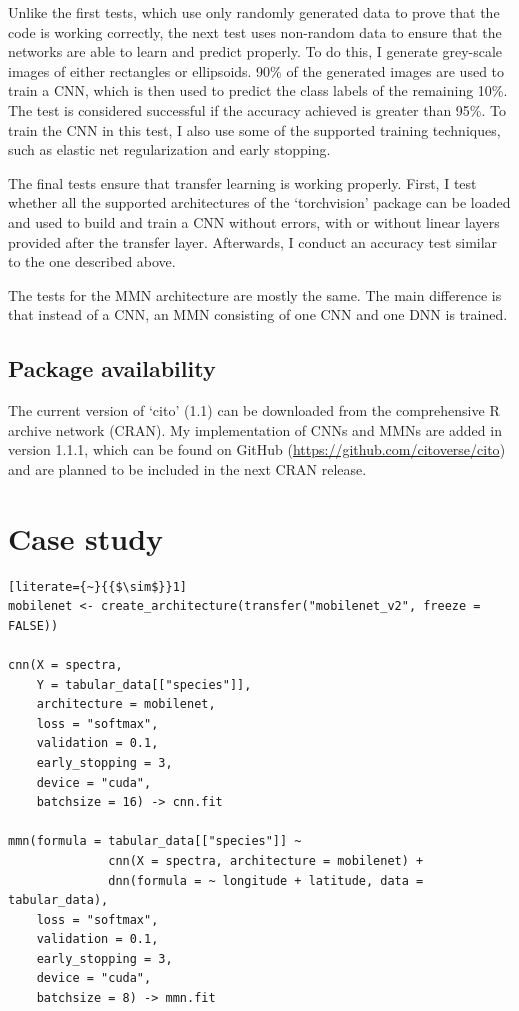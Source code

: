 \documentclass[12pt,twoside]{scrreport}
\newcommand{\pkg}[1]{`#1'}
\begin{document}
Unlike the first tests, which use only randomly generated data to prove that the code is working correctly, the next test uses non-random data to ensure that the networks are able to learn and predict properly. To do this, I generate grey-scale images of either rectangles or ellipsoids. 90\% of the generated images are used to train a CNN, which is then used to predict the class labels of the remaining 10\%. The test is considered successful if the accuracy achieved is greater than 95\%. To train the CNN in this test, I also use some of the supported training techniques, such as elastic net regularization and early stopping.

The final tests ensure that transfer learning is working properly. First, I test whether all the supported architectures of the \pkg{torchvision} package can be loaded and used to build and train a CNN without errors, with or without linear layers provided after the transfer layer. Afterwards, I conduct an accuracy test similar to the one described above.

The tests for the MMN architecture are mostly the same. The main difference is that instead of a CNN, an MMN consisting of one CNN and one DNN is trained.

\section*{Package availability}
The current version of \pkg{cito} (1.1) can be downloaded from the comprehensive R archive network (CRAN). My implementation of CNNs and MMNs are added in version 1.1.1, which can be found on GitHub (\url{https://github.com/citoverse/cito}) and are planned to be included in the next CRAN release.

\chapter*{Case study}
\newsavebox{\cnn} %
\begin{lrbox}{\cnn}
	\begin{lstlisting}[literate={~}{{$\sim$}}1]
mobilenet <- create_architecture(transfer("mobilenet_v2", freeze = FALSE))

cnn(X = spectra,
    Y = tabular_data[["species"]],
    architecture = mobilenet,
    loss = "softmax",
    validation = 0.1,
    early_stopping = 3,
    device = "cuda",
    batchsize = 16) -> cnn.fit
		
mmn(formula = tabular_data[["species"]] ~ 
              cnn(X = spectra, architecture = mobilenet) +
              dnn(formula = ~ longitude + latitude, data = tabular_data),
    loss = "softmax",
    validation = 0.1,
    early_stopping = 3,
    device = "cuda",
    batchsize = 8) -> mmn.fit
	\end{lstlisting}
\end{lrbox}
\end{document}
